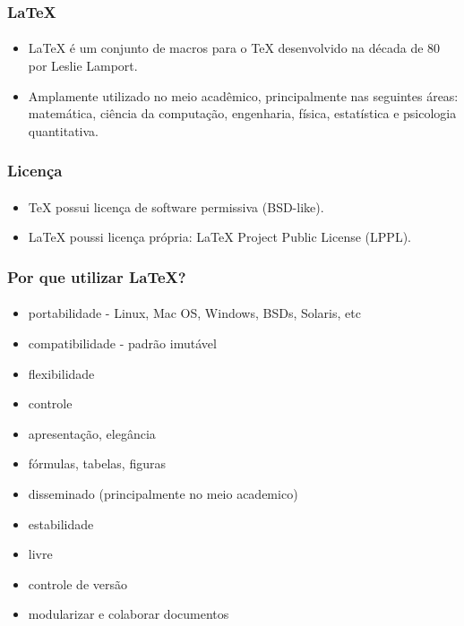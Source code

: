 \begin{frame}
\frametitle{\LaTeX{}}
\framesubtitle{}
\begin{itemize}
  \item \LaTeX{} é um conjunto de macros para o \TeX{} desenvolvido na década de 80 por Leslie Lamport.
  \item Amplamente utilizado no meio acadêmico, principalmente nas seguintes áreas: matemática, ciência da computação, engenharia, física, estatística e psicologia quantitativa.
\end{itemize}
\end{frame}



\begin{frame}
\frametitle{Licença}
\framesubtitle{}
\begin{itemize}
  \item \TeX{} possui licença de software permissiva (BSD-like).
  \item \LaTeX{} poussi licença própria: \LaTeX{} Project Public License (LPPL).
\end{itemize}
\end{frame}


\begin{frame}
\frametitle{Por que utilizar \LaTeX{}?}
\framesubtitle{}
\begin{itemize}
  \item portabilidade - Linux, Mac OS, Windows, BSDs, Solaris, etc
  \item compatibilidade - padrão imutável
  \item flexibilidade
  \item controle
  \item apresentação, elegância
  \item fórmulas, tabelas, figuras
  \item disseminado (principalmente no meio academico)
  \item estabilidade
  \item livre
  \item controle de versão
  \item modularizar e colaborar documentos
\end{itemize}
\end{frame}

